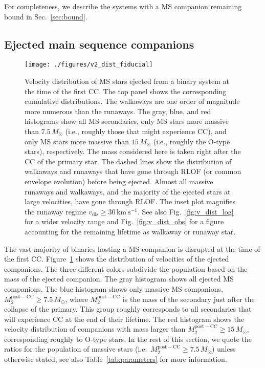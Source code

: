 \documentclass{aa}
\DeclareRobustCommand{\Figref}[1]{Fig.~\ref{#1}}
\DeclareRobustCommand{\Tabref}[1]{Table~\ref{#1}}
\DeclareRobustCommand{\Secref}[1]{Sec.~\ref{#1}}
\begin{document}
For completeness, we describe the systems
with a MS companion remaining bound in \Secref{sec:bound}.

\subsection{Ejected main sequence companions}
\label{sec:MS}

\begin{figure*}[htp]
  \centering
  \texttt{[image: ./figures/v2\_dist\_fiducial]}
  \caption{Velocity distribution of MS stars ejected
    from a binary system at the time of the first CC. The top panel shows
    the corresponding cumulative distributions. The 
    walkaways are one order of magnitude more numerous than the
    runaways. The gray, blue, and red histograms show all MS
    secondaries, only MS stars more massive than $7.5\,M_\odot$ (i.e.,
    roughly those that might experience CC), and only MS stars more
    massive than $15\,M_\odot$ (i.e., roughly the O-type stars),
    respectively. The mass considered here is taken right after the CC of the primary star. The dashed
    lines show the distribution of walkaways and runaways that have
    gone through RLOF (or common envelope evolution) before being
    ejected. Almost all massive runaways and walkaways, and the
    majority of the ejected stars at large velocities, have gone
    through RLOF. The inset plot magnifies the runaway regime
    $v_\mathrm{dis}\geq30\,\mathrm{km\ s^{-1}}$. See also
    \Figref{fig:v_dist_log} for a wider velocity range and
    \Figref{fig:v_dist_obs} for a figure accounting for the remaining
    lifetime as walkaway or runaway star.}
  \label{fig:v_dist}
\end{figure*}

The vast majority of binaries hosting a MS companion is disrupted at the time of
the first CC. Figure~\ref{fig:v_dist}
shows the distribution of velocities of the ejected companions. The three different colors subdivide the population based on
the mass of the ejected companion. The gray histogram shows all
ejected MS companions. The blue histogram shows only massive MS
companions, $M_2^\mathrm{post-CC}\geq 7.5\,M_\odot$, where
$M_2^\mathrm{post-CC}$ is the mass of the secondary just after the
collapse of the primary. This group roughly corresponds to all
secondaries that will experience CC at the end of their lifetime. The red histogram shows the velocity
distribution of companions with mass larger than $M_2^\mathrm{post-CC}\geq15\,M_\odot$, corresponding roughly to O-type
stars. In the rest of this section, we quote the ratios for the
population of massive stars (i.e.~$M_2^\mathrm{post-CC}\geq 7.5\,M_\odot$) unless
otherwise stated, see also \Tabref{tab:parameters} for more
information.
\end{document}
